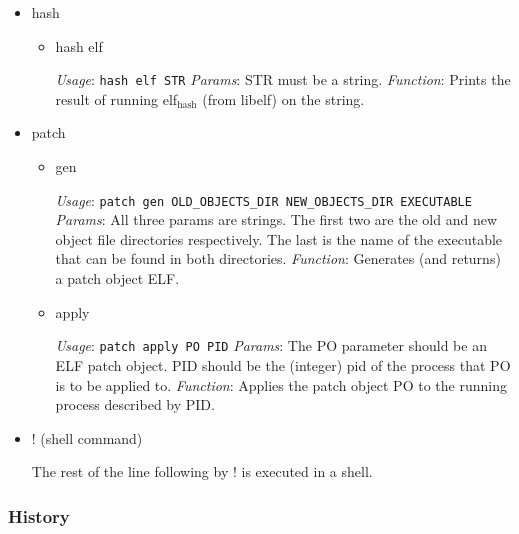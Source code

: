 \documentclass[11pt]{article}
\begin{document}
\begin{itemize}
\item hash\\
\label{sec-2.1.2.6}

\begin{itemize}

\item hash elf\\
\label{sec-2.1.2.6.1}

      \emph{Usage}: \texttt{hash elf STR}
      \emph{Params}: STR must be a string.
      \emph{Function}: Prints the result of running elf$_{\mathrm{hash}}$ (from libelf)
                  on the string.
                  
\end{itemize} %

\item patch\\
\label{sec-2.1.2.7}

\begin{itemize}

\item gen\\
\label{sec-2.1.2.7.1}

      \emph{Usage}: \texttt{patch gen OLD\_OBJECTS\_DIR NEW\_OBJECTS\_DIR EXECUTABLE}
      \emph{Params}: All three params are strings. The first two are the
                old and new object file directories respectively. The
                last is the name of the executable that can be found
                in both directories.
      \emph{Function}: Generates (and returns) a patch object ELF.

\item apply\\
\label{sec-2.1.2.7.2}

      \emph{Usage}: \texttt{patch apply PO PID}
      \emph{Params}: The PO parameter should be an ELF patch object. PID
                should be the (integer) pid of the process that PO is
                to be applied to.
      \emph{Function}: Applies the patch object PO to the running process
                  described by PID.
\end{itemize} %

\item ! (shell command)\\
\label{sec-2.1.2.8}

     The rest of the line following by ! is executed in a shell.
\end{itemize} %
\subsubsection{History}
\label{sec-2.1.3}
\end{document}
